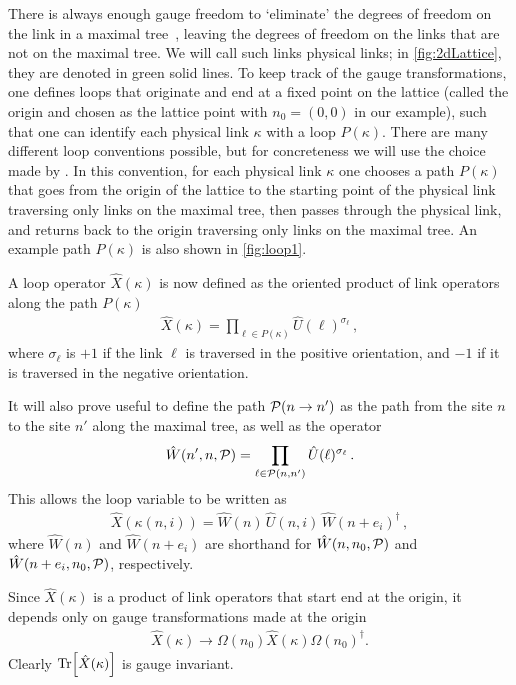 \documentclass[reprint,superscriptaddress,pra,nofootinbib,preprintnumbers,floatfix]{revtex4-1}
\begin{document}
There is always enough gauge freedom to `eliminate' the degrees of freedom on the link in a maximal tree~\cite{PhysRevD.15.1128}, leaving the degrees of freedom on the links that are not on the maximal tree. 
%
We will call such links physical links; in \cref{fig:2dLattice}, they are denoted in green solid lines.  
%
To keep track of the gauge transformations, one defines loops that originate and end at a fixed point on the lattice (called the origin and chosen as the lattice point with $n_0=(0,0)$ in our example), such that one can identify each physical link $\kappa$ with a loop $P(\kappa)$. 
%
There are many different loop conventions possible, but for concreteness we will use the choice made by \cite{Ligterink_2000}. 
%
In this convention, for each physical link $\kappa$ one chooses a path $P(\kappa)$ that goes from the origin of the lattice to the starting point of the physical link traversing only links on the maximal tree, then passes through the physical link, and returns back to the origin traversing only links on the maximal tree. 
%
An example path $P(\kappa)$ is also shown in \cref{fig:loop1}.
%

A loop operator $\hat X(\kappa)$ is now defined as the oriented product of link operators along the path $P(\kappa)$
%
\begin{align}
    \hat X(\kappa) = \prod_{\ell \in P(\kappa) } \hat U(\ell)^{\sigma_\ell}
    \,,
\end{align}
%
where $\sigma_\ell$ is $+1$ if the link $\ell$ is traversed in the positive orientation, and $-1$ if it is traversed in the negative orientation. 
%

It will also prove useful to define the path $ {\cal P}(n \to n')$ as the path from the site $n$ to the site $n'$ along the maximal tree,  as well as
the operator
%
\begin{align}
    \hat W(n', n, {\cal P}) = \prod_{\ell \in {\cal P}(n,n')} \hat U(\ell)^{\sigma_\ell}
    \,.
\end{align}
%
This allows the loop variable to be written as
%
\begin{align}
    \hat X(\kappa(n,i)) = \hat W(n) \, \hat U(n,i) \,\hat W(n+e_i)^\dagger
    \,,
\end{align}
%
where $\hat W(n)$ and $\hat W(n+e_i)$ are shorthand for $\hat W(n, n_0, {\cal P})$ and $\hat W(n+e_i, n_0, {\cal P})$, respectively.


%
Since $\hat X(\kappa)$ is a product of link operators that start end at the origin, it depends only on gauge transformations made at the origin
%
\begin{align}
\label{eq:global_gauge_y_app}
    \hat X(\kappa) \to \Omega(n_0)\hat X(\kappa) \Omega(n_0)^\dagger. 
\end{align}
%
Clearly $\Tr[\hat X(\kappa)]$ is gauge invariant.
%
\end{document}
